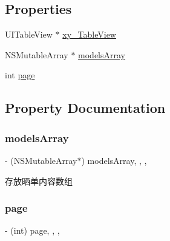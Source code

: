\subsection*{Properties}
\begin{DoxyCompactItemize}
\item 
U\+I\+Table\+View $\ast$ \mbox{\hyperlink{category_follower_view_controller_07_08_aaecb7796272a1092e3bda67c8bd6ddcd}{xy\+\_\+\+Table\+View}}
\item 
N\+S\+Mutable\+Array $\ast$ \mbox{\hyperlink{category_follower_view_controller_07_08_abc96c9d030c5007a0df56270f8839c5f}{models\+Array}}
\item 
int \mbox{\hyperlink{category_follower_view_controller_07_08_a85179ae31a5e1cd75ab900d01444d931}{page}}
\end{DoxyCompactItemize}


\subsection{Property Documentation}
\mbox{\label{category_follower_view_controller_07_08_abc96c9d030c5007a0df56270f8839c5f}} 
\subsubsection{\texorpdfstring{models\+Array}{modelsArray}}
{\footnotesize\ttfamily -\/ (N\+S\+Mutable\+Array$\ast$) models\+Array\hspace{0.3cm}{\ttfamily [read]}, {\ttfamily [write]}, {\ttfamily [nonatomic]}, {\ttfamily [strong]}}

存放晒单内容数组 \mbox{\label{category_follower_view_controller_07_08_a85179ae31a5e1cd75ab900d01444d931}} 
\subsubsection{\texorpdfstring{page}{page}}
{\footnotesize\ttfamily -\/ (int) page\hspace{0.3cm}{\ttfamily [read]}, {\ttfamily [write]}, {\ttfamily [nonatomic]}, {\ttfamily [assign]}}

